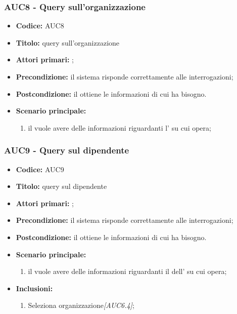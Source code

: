\documentclass[casi-duso]{subfiles}
\begin{document}
\subsubsection{AUC8 - Query sull'organizzazione}%
\label{subsub:AUC8}
\begin{itemize}
  \item \textbf{Codice:} AUC8
  \item \textbf{Titolo:} query sull'organizzazione
  \item \textbf{Attori primari:} ;
  \item \textbf{Precondizione:} il sistema risponde correttamente alle interrogazioni;
  \item \textbf{Postcondizione:} il  ottiene le informazioni di cui ha bisogno.
  \item \textbf{Scenario principale:}
  \begin{enumerate}
    \item il  vuole avere delle informazioni riguardanti l' su cui opera;
  \end{enumerate}
\end{itemize}

\subsubsection{AUC9 - Query sul dipendente}%
\label{subsub:AUC9}
\begin{itemize}
  \item \textbf{Codice:} AUC9
  \item \textbf{Titolo:} query sul dipendente
  \item \textbf{Attori primari:} ;
  \item \textbf{Precondizione:} il sistema risponde correttamente alle interrogazioni;
  \item \textbf{Postcondizione:} il  ottiene le informazioni di cui ha bisogno.
  \item \textbf{Scenario principale:}
  \begin{enumerate}
    \item il  vuole avere delle informazioni riguardanti il dell' su cui opera;
  \end{enumerate}
  \item \textbf{Inclusioni:}
  \begin{enumerate}
    \item Seleziona organizzazione\emph{[AUC6.4]};
  \end{enumerate}
\end{itemize}
\end{document}

